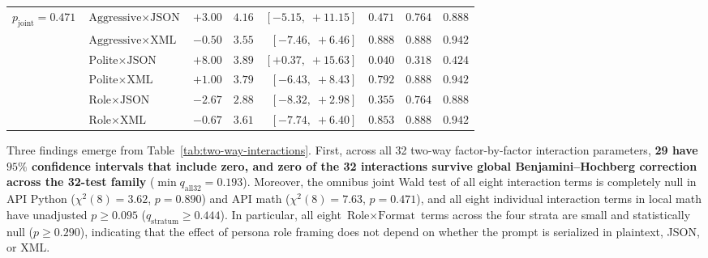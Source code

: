 \documentclass[a4paper,fleqn]{cas-sc}
\begin{document}
\begin{table}[htbp]
\begin{tabular}{@{}llrrrrrr@{}}
$p_{\text{joint}} = 0.471$ & $\text{Aggressive} \times \text{JSON}$ & $+3.00$ & $4.16$ & $[-5.15,\; +11.15]$ & $0.471$ & $0.764$ & $0.888$ \\
 & $\text{Aggressive} \times \text{XML}$ & $-0.50$ & $3.55$ & $[-7.46,\; +6.46]$ & $0.888$ & $0.888$ & $0.942$ \\
 & $\text{Polite} \times \text{JSON}$ & $+8.00$ & $3.89$ & $[+0.37,\; +15.63]$ & $0.040$ & $0.318$ & $0.424$ \\
 & $\text{Polite} \times \text{XML}$ & $+1.00$ & $3.79$ & $[-6.43,\; +8.43]$ & $0.792$ & $0.888$ & $0.942$ \\
 & $\text{Role} \times \text{JSON}$ & $-2.67$ & $2.88$ & $[-8.32,\; +2.98]$ & $0.355$ & $0.764$ & $0.888$ \\
 & $\text{Role} \times \text{XML}$ & $-0.67$ & $3.61$ & $[-7.74,\; +6.40]$ & $0.853$ & $0.888$ & $0.942$ \\
\bottomrule
\end{tabular}
\end{table}

Three findings emerge from Table~\ref{tab:two-way-interactions}. First, across all 32 two-way factor-by-factor interaction parameters, \textbf{29 have $95\%$ confidence intervals that include zero, and zero of the 32 interactions survive global Benjamini--Hochberg correction across the 32-test family} ($\min q_{\text{all32}} = 0.193$). Moreover, the omnibus joint Wald test of all eight interaction terms is completely null in API Python ($\chi^2(8) = 3.62$, $p = 0.890$) and API math ($\chi^2(8) = 7.63$, $p = 0.471$), and all eight individual interaction terms in local math have unadjusted $p \ge 0.095$ ($q_{\text{stratum}} \ge 0.444$). In particular, all eight $\text{Role} \times \text{Format}$ terms across the four strata are small and statistically null ($p \ge 0.290$), indicating that the effect of persona role framing does not depend on whether the prompt is serialized in plaintext, JSON, or XML.
\end{document}
